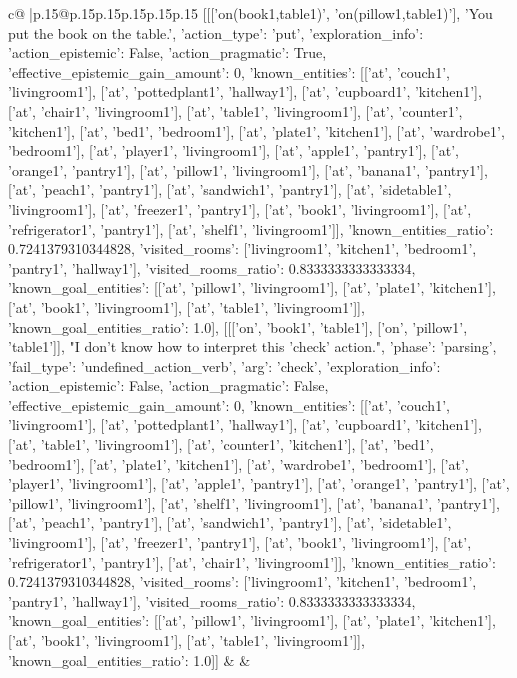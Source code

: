 \documentclass{article}
\begin{document}
{\begin{supertabular}{c@{$\;$}|p{.15\linewidth}@{}p{.15\linewidth}p{.15\linewidth}p{.15\linewidth}p{.15\linewidth}p{.15\linewidth}}
{{{	 [[['on(book1,table1)', 'on(pillow1,table1)'], 'You put the book on the table.', {'action_type': 'put', 'exploration_info': {'action_epistemic': False, 'action_pragmatic': True, 'effective_epistemic_gain_amount': 0, 'known_entities': [['at', 'couch1', 'livingroom1'], ['at', 'pottedplant1', 'hallway1'], ['at', 'cupboard1', 'kitchen1'], ['at', 'chair1', 'livingroom1'], ['at', 'table1', 'livingroom1'], ['at', 'counter1', 'kitchen1'], ['at', 'bed1', 'bedroom1'], ['at', 'plate1', 'kitchen1'], ['at', 'wardrobe1', 'bedroom1'], ['at', 'player1', 'livingroom1'], ['at', 'apple1', 'pantry1'], ['at', 'orange1', 'pantry1'], ['at', 'pillow1', 'livingroom1'], ['at', 'banana1', 'pantry1'], ['at', 'peach1', 'pantry1'], ['at', 'sandwich1', 'pantry1'], ['at', 'sidetable1', 'livingroom1'], ['at', 'freezer1', 'pantry1'], ['at', 'book1', 'livingroom1'], ['at', 'refrigerator1', 'pantry1'], ['at', 'shelf1', 'livingroom1']], 'known_entities_ratio': 0.7241379310344828, 'visited_rooms': ['livingroom1', 'kitchen1', 'bedroom1', 'pantry1', 'hallway1'], 'visited_rooms_ratio': 0.8333333333333334, 'known_goal_entities': [['at', 'pillow1', 'livingroom1'], ['at', 'plate1', 'kitchen1'], ['at', 'book1', 'livingroom1'], ['at', 'table1', 'livingroom1']], 'known_goal_entities_ratio': 1.0}}], [[['on', 'book1', 'table1'], ['on', 'pillow1', 'table1']], "I don't know how to interpret this 'check' action.", {'phase': 'parsing', 'fail_type': 'undefined_action_verb', 'arg': 'check', 'exploration_info': {'action_epistemic': False, 'action_pragmatic': False, 'effective_epistemic_gain_amount': 0, 'known_entities': [['at', 'couch1', 'livingroom1'], ['at', 'pottedplant1', 'hallway1'], ['at', 'cupboard1', 'kitchen1'], ['at', 'table1', 'livingroom1'], ['at', 'counter1', 'kitchen1'], ['at', 'bed1', 'bedroom1'], ['at', 'plate1', 'kitchen1'], ['at', 'wardrobe1', 'bedroom1'], ['at', 'player1', 'livingroom1'], ['at', 'apple1', 'pantry1'], ['at', 'orange1', 'pantry1'], ['at', 'pillow1', 'livingroom1'], ['at', 'shelf1', 'livingroom1'], ['at', 'banana1', 'pantry1'], ['at', 'peach1', 'pantry1'], ['at', 'sandwich1', 'pantry1'], ['at', 'sidetable1', 'livingroom1'], ['at', 'freezer1', 'pantry1'], ['at', 'book1', 'livingroom1'], ['at', 'refrigerator1', 'pantry1'], ['at', 'chair1', 'livingroom1']], 'known_entities_ratio': 0.7241379310344828, 'visited_rooms': ['livingroom1', 'kitchen1', 'bedroom1', 'pantry1', 'hallway1'], 'visited_rooms_ratio': 0.8333333333333334, 'known_goal_entities': [['at', 'pillow1', 'livingroom1'], ['at', 'plate1', 'kitchen1'], ['at', 'book1', 'livingroom1'], ['at', 'table1', 'livingroom1']], 'known_goal_entities_ratio': 1.0}}]] 
	  } 
	   } 
	   } 
	 & & \\ 
 


\end{supertabular}}
\end{document}
